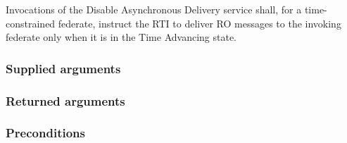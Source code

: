 \begin{compactstdpage}
    Invocations of the Disable Asynchronous Delivery service shall, for a time-constrained federate, instruct the RTI to deliver RO messages to the invoking federate only when it is in the Time Advancing state.

    \subsubsection{Supplied arguments}


    \subsubsection{Returned arguments}


    \subsubsection{Preconditions}



\end{compactstdpage}

\clearpage

